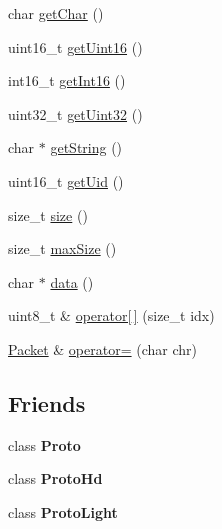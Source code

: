\begin{DoxyCompactItemize}
char \hyperlink{classTiny_1_1Packet_a260645f9d055da878f149a13ecd58844}{get\+Char} ()
\item 
uint16\+\_\+t \hyperlink{classTiny_1_1Packet_a71765e73adfbc67138f75c2b8ea7d74c}{get\+Uint16} ()
\item 
int16\+\_\+t \hyperlink{classTiny_1_1Packet_a7dfed04418564f93dd4d2b4e9144a861}{get\+Int16} ()
\item 
uint32\+\_\+t \hyperlink{classTiny_1_1Packet_a5dd4b89cb7224b62d4f0328c8e40f38f}{get\+Uint32} ()
\item 
char $\ast$ \hyperlink{classTiny_1_1Packet_a8bc9a3b3f41be292f9c5ac566afeb04b}{get\+String} ()
\item 
uint16\+\_\+t \hyperlink{classTiny_1_1Packet_a5333df49a8becff438d3e36b0ca8d3f0}{get\+Uid} ()
\item 
size\+\_\+t \hyperlink{classTiny_1_1Packet_a872f81d4ad35e49b232101c7c12e34f2}{size} ()
\item 
size\+\_\+t \hyperlink{classTiny_1_1Packet_ac6545b3b5df97d5f1ea1a15abc0570ed}{max\+Size} ()
\item 
char $\ast$ \hyperlink{classTiny_1_1Packet_a3307ba504caba9c5eee8f1f32cf1a749}{data} ()
\item 
uint8\+\_\+t \& \hyperlink{classTiny_1_1Packet_abfaef504eb88a4db88bca3b907770fa2}{operator\mbox{[}$\,$\mbox{]}} (size\+\_\+t idx)
\item 
\hyperlink{classTiny_1_1Packet}{Packet} \& \hyperlink{classTiny_1_1Packet_a2de2c7f2c3ea6baaab462dd7e4469ecb}{operator=} (char chr)
\end{DoxyCompactItemize}
\subsection*{Friends}
\begin{DoxyCompactItemize}
\item 
\hypertarget{classTiny_1_1Packet_a45bd055fddab40aaf0c60bfb9e21aa6f}{}class {\bfseries Proto}\label{classTiny_1_1Packet_a45bd055fddab40aaf0c60bfb9e21aa6f}

\item 
\hypertarget{classTiny_1_1Packet_a7f90e063a34c3417ed1ea25e64608857}{}class {\bfseries Proto\+Hd}\label{classTiny_1_1Packet_a7f90e063a34c3417ed1ea25e64608857}

\item 
\hypertarget{classTiny_1_1Packet_a1d317236f2a79fa559d5a9112e555882}{}class {\bfseries Proto\+Light}\label{classTiny_1_1Packet_a1d317236f2a79fa559d5a9112e555882}

\end{DoxyCompactItemize}


